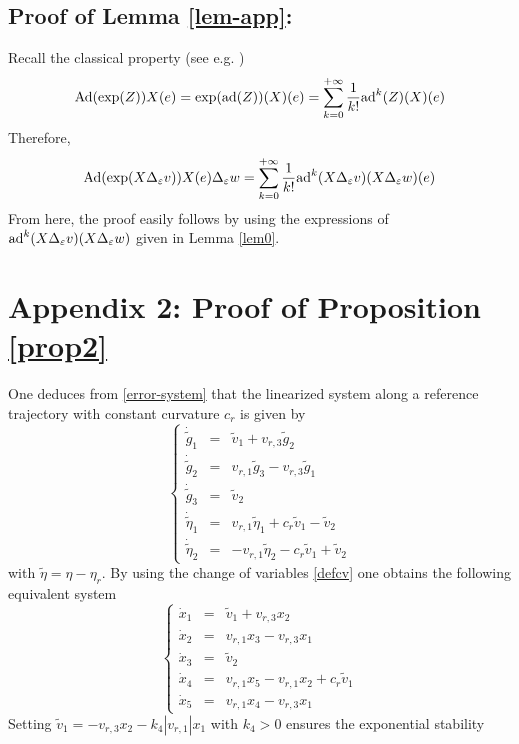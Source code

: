 \documentclass[a4paper,twoside]{article}
\def \Ad {\textnormal{Ad}}
\def \ad {\textnormal{ad}}
\def \eps {\varepsilon}
\def \finproof{\hfill\hbox{\vrule width1.0ex height1.5ex}}
\begin{document}
\subsection*{Proof of Lemma \ref{lem-app}:}
Recall the classical property (see e.g. \cite{he78}) 
\[
\Ad(\exp(Z))X(e)= \exp(\ad (Z))(X)(e) = \sum_{k=0}^{+\infty} \frac{1}{k!} \ad^k(Z)(X)(e)
\]
Therefore,
\begin{equation}
\label{lem-p1}
\Ad(\exp(X \Delta_\eps v)) X(e) \Delta_\eps w = \sum_{k=0}^{+\infty} \frac{1}{k!} \ad^k(X \Delta_\eps v)(X \Delta_\eps w)(e)
\end{equation}
From here, the proof easily follows by using the expressions of $\ad^k(X \Delta_\eps v)(X \Delta_\eps w)$ given in Lemma \ref{lem0}.
\finproof



\section*{Appendix 2: Proof of Proposition \ref{prop2}}
One deduces from \eqref{error-system} that the linearized system along a
reference trajectory with constant curvature $c_r$ is given by
\[
\left \{
\begin{array}{lcl}
\dot{\tilde g}_1 & = & \tilde v_1 + v_{r,3} \tilde g_2 \\
\dot{\tilde g}_2 & = & v_{r,1} \tilde g_3 - v_{r,3} \tilde g_1 \\
\dot{\tilde g}_3 & = & \tilde v_2 \\
\dot{\tilde \eta}_1 & = & v_{r,1} \tilde \eta_1 + c_r \tilde v_1 - \tilde v_2 \\
\dot{\tilde \eta}_2 & = &  -v_{r,1} \tilde \eta_2 - c_r \tilde v_1 + \tilde v_2
\end{array}
\right.
\]
with $\tilde{\eta}=\eta-\eta_r$. By using the change of variables \eqref{defcv}
one obtains the following equivalent system
\begin{equation}
\label{linear-trailer}
\left \{
\begin{array}{lcl}
\dot x_1 & =  & \tilde v_1 + v_{r,3} x_2 \\
\dot x_2 & = &  v_{r,1} x_3 - v_{r,3} x_1 \\
\dot x_3 & = & \tilde v_2 \\
\dot x_4 & = &  v_{r,1} x_5 -  v_{r,1} x_2 + c_r \tilde v_1 \\
\dot x_5 & = &  v_{r,1} x_4-  v_{r,3} x_1
\end{array}
\right.
\end{equation}
Setting $\tilde v_1=  - v_{r,3} x_2 - k_4 |v_{r,1}| x_1$ with $k_4>0$ ensures the exponential stability
\end{document}
